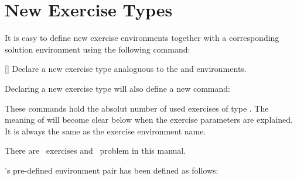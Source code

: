 \documentclass{xsim-manual}
\begin{document}
\section{New Exercise Types}\label{sec:new-exercise-types}

It is easy to define new exercise environments together with a corresponding
solution environment using the following command:
\begin{commands}
  []
    Declare a new exercise type analoguous to the  and
     environments.
\end{commands}
Declaring a new exercise type will also define a new command:
\begin{commands}
    These commands hold the absolut number of used exercises of type
    .  The meaning of  will become clear below
    when the exercise parameters are explained.  It is always the same as the
    exercise environment name.
\end{commands}
\begin{example}
  There are \numberofexercises~exercises and \numberofproblems~problem in this
  manual.
\end{example}
\xsim's pre-defined environment pair has been defined as follows:
\begin{sourcecode}
\end{sourcecode}
\end{document}
